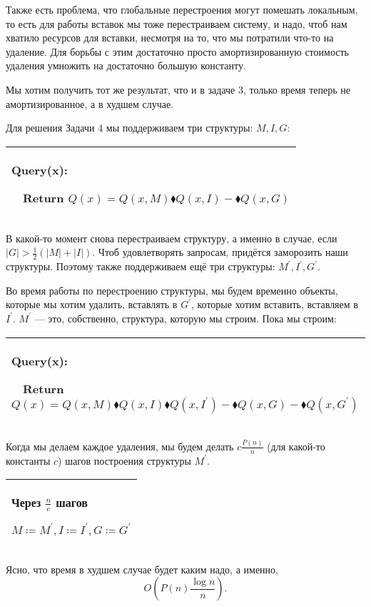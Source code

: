 Также есть проблема, что глобальные перестроения могут помешать локальным, то есть для работы вставок мы тоже перестраиваем систему, и надо, чтоб нам хватило ресурсов для вставки, несмотря на то, что мы потратили что-то на удаление. Для борьбы с этим достаточно просто амортизированную стоимость удаления умножить на достаточно большую константу.


\begin{task}
Мы хотим получить тот же результат, что и в задаче 3, только время теперь не амортизированное, а в худшем случае.
\end{task}

Для решения Задачи 4 мы поддерживаем три структуры: $M,I,G$:

\begin{tabular}{|p{8cm}|}
\hline
Query(x):

$\quad$Return $Q(x)=Q(x,M)\blacklozenge Q(x,I)-\blacklozenge Q(x,G)$\\
\hline
\end{tabular}


В какой-то момент снова перестраиваем структуру, а именно в случае, если $|G|>\frac{1}{2}(|M|+|I|)$. Чтоб удовлетворять запросам, придётся заморозить наши структуры. Поэтому также поддерживаем ещё три структуры: $M^\prime,I^\prime,G^\prime$.

Во время работы по перестроению структуры, мы будем временно объекты, которые мы хотим удалить, вставлять в $G^\prime$, которые хотим вставить, вставляем в $I^\prime$. $M^\prime$ — это, собственно, структура, которую мы строим. Пока мы строим:

\begin{tabular}{|p{11cm}|}
\hline
Query(x):

$\quad$Return $Q(x)=Q(x,M)\blacklozenge Q(x,I) \blacklozenge Q(x,I^\prime)-\blacklozenge Q(x,G)-\blacklozenge Q(x,G^\prime)$\\
\hline
\end{tabular}


Когда мы делаем каждое удаления, мы будем делать $c\frac{P(n)}{n}$ (для какой-то константы $c$) шагов построения структуры $M^\prime$.

\begin{tabular}{|p{4cm}|}
\hline
Через $\frac{n}{c}$ шагов

$M \coloneqq M^\prime,I \coloneqq I^\prime,G \coloneqq G^\prime$\\
\hline
\end{tabular}


Ясно, что время в худшем случае будет каким надо, а именно,
$$O\left(P(n)\frac{\log n}{n} \right).$$

